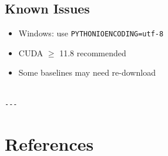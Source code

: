 \subsection{Known Issues}

\begin{itemize}
\item Windows: use \texttt{PYTHONIOENCODING=utf-8}
\item CUDA $\ge$ 11.8 recommended
\item Some baselines may need re-download
\end{itemize}
\begin{lstlisting}

---
\end{lstlisting}


\section{References}

